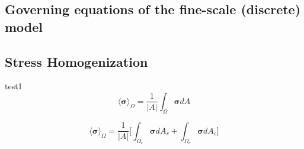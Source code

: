 \subsection{Governing equations of the fine-scale (discrete) model}

\subsection{Stress Homogenization}
test1
\begin{equation}
\label{eqn:stressav}
\langle \boldsymbol{\sigma} \rangle_\Omega = \frac{1}{\vert A \vert} \int_\Omega \boldsymbol{\sigma} { dA}
\end{equation}

\begin{equation}
\label{eqn:stresssplit}
\langle \boldsymbol{\sigma} \rangle_\Omega = \frac{1}{\vert A \vert} \bigg \lbrack {\int_{\Omega_{r}} \boldsymbol{\sigma} { dA_r} + \int_{\Omega_{c}} \boldsymbol{\sigma} { dA_c}} \bigg \rbrack
\end{equation}


